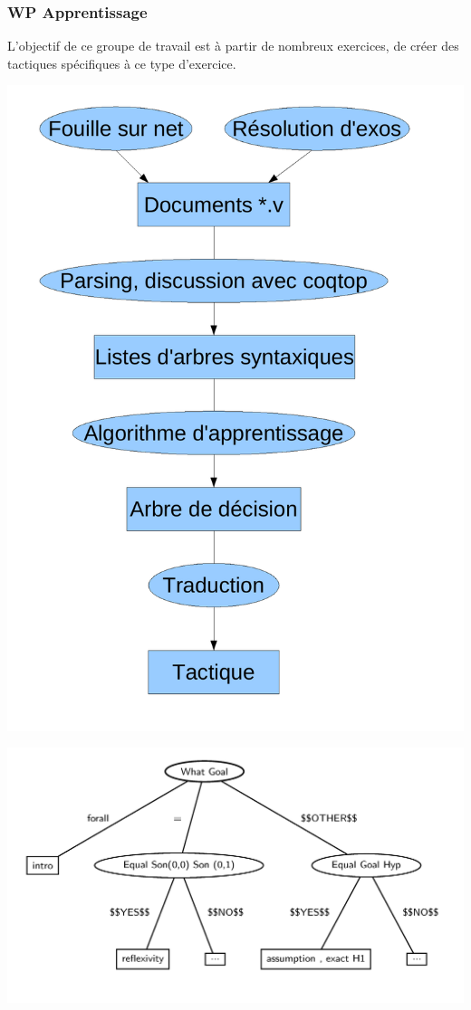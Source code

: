 \begin{frame}
\frametitle{WP Apprentissage} 
\begin{minipage}{6cm}
L'objectif de ce groupe de travail est à partir de nombreux exercices, de créer des tactiques spécifiques à ce type d'exercice.
\end{minipage}
\begin{minipage}{4cm}
\includegraphics[scale=0.2]{../images/apprentissage/organisation_apprentissage.pdf}
\end{minipage}

\end{frame}

\begin{frame}
\includegraphics{../images/apprentissage/decision_tree.jpg}
\end{frame}

